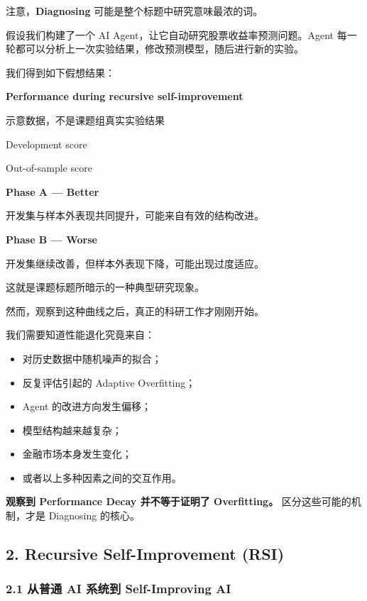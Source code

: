注意，\textbf{Diagnosing} 可能是整个标题中研究意味最浓的词。

假设我们构建了一个 AI Agent，让它自动研究股票收益率预测问题。Agent 每一轮都可以分析上一次实验结果，修改预测模型，随后进行新的实验。

我们得到如下假想结果：

\textbf{Performance during recursive self-improvement}

示意数据，不是课题组真实实验结果

Development score

Out-of-sample score


\textbf{Phase A --- Better}

开发集与样本外表现共同提升，可能来自有效的结构改进。

\textbf{Phase B --- Worse}

开发集继续改善，但样本外表现下降，可能出现过度适应。

这就是课题标题所暗示的一种典型研究现象。

然而，观察到这种曲线之后，真正的科研工作才刚刚开始。

我们需要知道性能退化究竟来自：

\begin{itemize}
\tightlist
\item
  对历史数据中随机噪声的拟合；
\item
  反复评估引起的 Adaptive Overfitting；
\item
  Agent 的改进方向发生偏移；
\item
  模型结构越来越复杂；
\item
  金融市场本身发生变化；
\item
  或者以上多种因素之间的交互作用。
\end{itemize}

\textbf{观察到 Performance Decay 并不等于证明了 Overfitting。} 区分这些可能的机制，才是 Diagnosing 的核心。

\hypertarget{part-1-03-0001-recursive-self-improvement-rsi}{%
\subsection{2. Recursive Self-Improvement (RSI)}\label{part-1-03-0001-recursive-self-improvement-rsi}}

\hypertarget{part-1-03-0001-ux4eceux666eux901a-ai-ux7cfbux7edfux5230-self-improving-ai}{%
\subsubsection{2.1 从普通 AI 系统到 Self-Improving AI}\label{part-1-03-0001-ux4eceux666eux901a-ai-ux7cfbux7edfux5230-self-improving-ai}}

